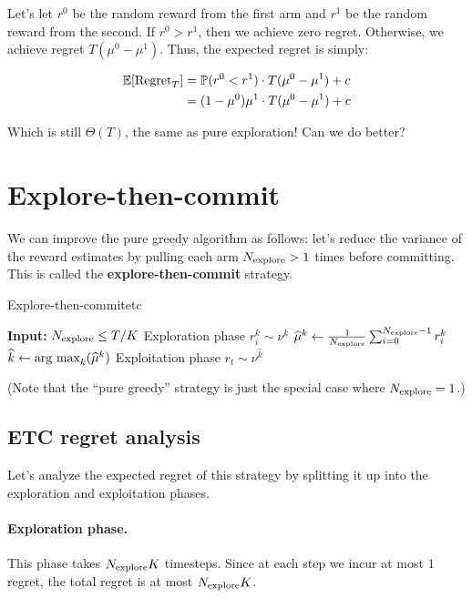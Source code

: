 \documentclass[\main/main]{subfiles}
\begin{document}
Let's let $r^0$ be the random reward from the first arm and $r^1$ be the random reward from the second. If $r^0 > r^1$, then we achieve zero regret. Otherwise, we achieve regret $T(\mu^0 - \mu^1)$. Thus, the expected regret is simply:

\begin{align*}
    \operatorname*{\mathbb{E}}[\text{Regret}_T] & = \operatorname{\mathbb{P}}(r^0 < r^1) \cdot T(\mu^0 - \mu^1) + c     \\
                        & = (1 - \mu^0) \mu^1 \cdot T(\mu^0 - \mu^1) + c
\end{align*}

Which is still $\Theta(T)$, the same as pure exploration! Can we do better?

\section{Explore-then-commit}

We can improve the pure greedy algorithm as follows:
let's reduce the variance of the reward estimates by pulling each arm $N_{\text{explore}} > 1$ times before committing. This is called the \textbf{explore-then-commit} strategy.
\begin{definition}{Explore-then-commit}{etc}
    \begin{algorithmic}
        \State \textbf{Input:} $N_{\text{explore}} \le T/K$
        \Comment Exploration phase
        \State $r^k_i \sim \nu^k$
        \EndFor
        \State $\widehat \mu^k \gets \frac{1}{N_{\text{explore}}} \sum_{i=0}^{N_{\text{explore}}-1} r^k_i$
        \EndFor
        \State $\widehat k \gets \operatorname*{\textrm{arg\ max}}_k (\widehat \mu^k)$
        \Comment Exploitation phase
        \State $r_t \sim \nu^{\hat k}$
        \EndFor
    \end{algorithmic}
\end{definition}
(Note that the ``pure greedy'' strategy is just the special case where $N_{\text{explore}} = 1$.)

\subsection{ETC regret analysis} \label{sec:etc-regret-analysis}

Let's analyze the expected regret of this strategy by splitting it up into the exploration and exploitation phases.

\paragraph*{Exploration phase.} This phase takes $N_{\text{explore}} K$ timesteps. Since at each step we incur at most $1$ regret, the total regret is at most $N_{\text{explore}} K$.
\end{document}
